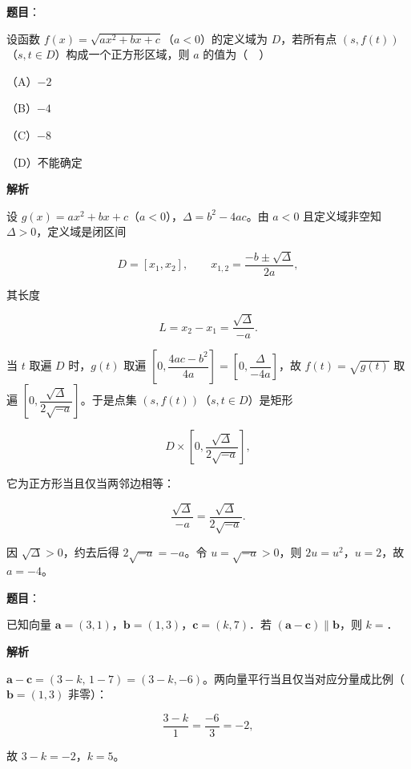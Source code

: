 \begin{answer}

\textbf{题目}：

设函数 $f(x)=\sqrt{ax^2+bx+c}$（$a<0$）的定义域为 $D$，若所有点 $(s,f(t))$（$s,t\in D$）构成一个正方形区域，则 $a$ 的值为（　）

（A）$-2$

（B）$-4$

（C）$-8$

（D）不能确定

\textbf{解析}

设 $g(x)=ax^2+bx+c$（$a<0$），$\Delta=b^2-4ac$。由 $a<0$ 且定义域非空知 $\Delta>0$，定义域是闭区间

\nopagebreak[4]
\[D=[x_1,x_2],\qquad x_{1,2}=\frac{-b\pm\sqrt\Delta}{2a},\]

其长度

\nopagebreak[4]
\[L=x_2-x_1=\frac{\sqrt\Delta}{-a}.\]

当 $t$ 取遍 $D$ 时，$g(t)$ 取遍 $\left[0,\dfrac{4ac-b^2}{4a}\right]=\left[0,\dfrac{\Delta}{-4a}\right]$，故 $f(t)=\sqrt{g(t)}$ 取遍 $\left[0,\dfrac{\sqrt\Delta}{2\sqrt{-a}}\right]$。于是点集 $(s,f(t))$（$s,t\in D$）是矩形

\nopagebreak[4]
\[D\times\left[0,\frac{\sqrt\Delta}{2\sqrt{-a}}\right],\]

它为正方形当且仅当两邻边相等：

\nopagebreak[4]
\[\frac{\sqrt\Delta}{-a}=\frac{\sqrt\Delta}{2\sqrt{-a}}.\]

因 $\sqrt\Delta>0$，约去后得 $2\sqrt{-a}=-a$。令 $u=\sqrt{-a}>0$，则 $2u=u^2$，$u=2$，故 $a=-4$。


\end{answer}
\begin{answer}

\textbf{题目}：

已知向量 $\boldsymbol a=(3,1)$，$\boldsymbol b=(1,3)$，$\boldsymbol c=(k,7)$．若 $(\boldsymbol a-\boldsymbol c)\parallel\boldsymbol b$，则 $k=$\gkblank{}．

\textbf{解析}

$\boldsymbol a-\boldsymbol c=(3-k,\,1-7)=(3-k,-6)$。两向量平行当且仅当对应分量成比例（$\boldsymbol b=(1,3)$ 非零）：

\nopagebreak[4]
\[\frac{3-k}{1}=\frac{-6}{3}=-2,\]

故 $3-k=-2$，$k=5$。


\end{answer}
